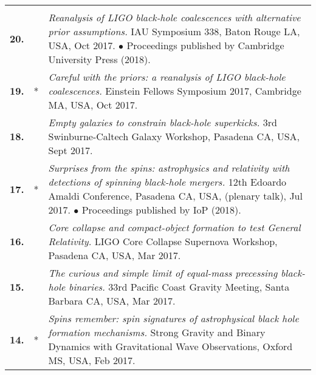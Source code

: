 {\begin{longtable}{rp{0.3cm}p{15.8cm}}
\vspace{0.05cm}\\
%
\textbf{20.} &  & \textit{Reanalysis of LIGO black-hole coalescences with alternative prior assumptions.}
\newline{}
IAU Symposium 338, Baton Rouge LA, USA, Oct 2017.
\newline{}
\textcolor{color1}{$\bullet$} Proceedings published by Cambridge University Press (2018).
\vspace{0.05cm}\\
%
\textbf{19.} & * & \textit{Careful with the priors: a reanalysis of LIGO black-hole coalescences.}
\newline{}
Einstein Fellows Symposium 2017, Cambridge MA, USA, Oct 2017.
\vspace{0.05cm}\\
%
\textbf{18.} &  & \textit{Empty galaxies to constrain black-hole superkicks.}
\newline{}
3rd Swinburne-Caltech Galaxy Workshop, Pasadena CA, USA, Sept 2017.
\vspace{0.05cm}\\
%
\textbf{17.} & * & \textit{Surprises from the spins: astrophysics and relativity with detections of spinning black-hole mergers.}
\newline{}
12th Edoardo Amaldi Conference, Pasadena CA, USA, (plenary talk), Jul 2017.
\newline{}
\textcolor{color1}{$\bullet$} Proceedings published by IoP (2018).
\vspace{0.05cm}\\
%
\textbf{16.} &  & \textit{Core collapse and compact-object formation to test General Relativity.}
\newline{}
LIGO Core Collapse Supernova Workshop, Pasadena CA, USA, Mar 2017.
\vspace{0.05cm}\\
%
\textbf{15.} &  & \textit{The curious and simple limit of equal-mass precessing black-hole binaries.}
\newline{}
33rd Pacific Coast Gravity Meeting, Santa Barbara CA, USA, Mar 2017.
\vspace{0.05cm}\\
%
\textbf{14.} & * & \textit{Spins remember: spin signatures of astrophysical black hole formation mechanisms.}
\newline{}
Strong Gravity and Binary Dynamics with Gravitational Wave Observations, Oxford MS, USA, Feb 2017.
\vspace{0.05cm}\\

\end{longtable}}
